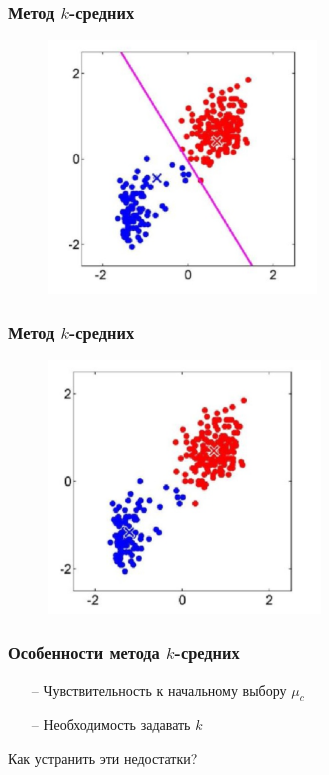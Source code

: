 \documentclass[12pt]{beamer}
\begin{document}
\begin{frame}\frametitle{Метод $k$-средних}
\begin{figure}[htbp]
  \includegraphics[height=190pt, keepaspectratio = true]{images/k-means-4}   
\end{figure}
\end{frame}

\begin{frame}\frametitle{Метод $k$-средних}
\begin{figure}[htbp]
  \includegraphics[height=190pt, keepaspectratio = true]{images/k-means-5}   
\end{figure}
\end{frame}

\begin{frame}\frametitle{Особенности метода $k$-средних}
\begin{itemize}
\item[--] Чувствительность к начальному выбору $\mu_c$
\item[--] Необходимость задавать $k$
\end{itemize}
Как устранить эти недостатки?
\end{frame}
\end{document}
